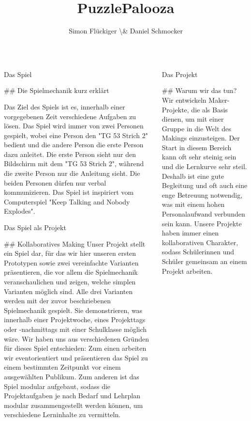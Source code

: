 \documentclass{beamer}%
\title{PuzzlePalooza}%
\author[info@swissmakers.ch]{Simon Flückiger \textbackslash{}\& Daniel Schmocker}%
\institute{Swiss Makers}%
\begin{document}
%
\normalsize%
\begin{columns}[T]%
\begin{column}{.32\textwidth}%
\begin{block}{Das Spiel}%
\begin{markdown}
## Die Spielmechanik kurz erklärt

Das Ziel des Spiels ist es, innerhalb einer vorgegebenen Zeit verschiedene Aufgaben zu lösen. Das Spiel wird immer von zwei Personen gespielt, wobei eine Person den "TG 53 Strich 2" bedient und die andere Person die erste Person dazu anleitet. Die erste Person sieht nur den Bildschirm mit dem "TG 53 Strich 2", während die zweite Person nur die Anleitung sieht. Die beiden Personen dürfen nur verbal kommunizieren. Das Spiel ist inspiriert vom Computerspiel "Keep Talking and Nobody Explodes".
\end{markdown}%
\end{block}%
\begin{block}{Das Spiel als Projekt}%
\begin{markdown}
## Kollaboratives Making
Unser Projekt stellt ein Spiel dar, für das wir hier unseren ersten Prototypen sowie zwei vereinfachte Varianten präsentieren, die vor allem die Spielmechanik veranschaulichen und zeigen, welche simplen Varianten möglich sind. Alle drei Varianten werden mit der zuvor beschriebenen Spielmechanik gespielt. Sie demonstrieren, was innerhalb einer Projektwoche, eines Projekttags oder -nachmittags mit einer Schulklasse möglich wäre. Wir haben uns aus verschiedenen Gründen für dieses Spiel entschieden: Zum einen arbeiten wir eventorientiert und präsentieren das Spiel zu einem bestimmten Zeitpunkt vor einem ausgewählten Publikum. Zum anderen ist das Spiel modular aufgebaut, sodass die Projektaufgaben je nach Bedarf und Lehrplan modular zusammengestellt werden können, um verschiedene Lerninhalte zu vermitteln.
\end{markdown}%
\end{block}%
\end{column}%
\begin{column}{.32\textwidth}%
\begin{block}{Das Projekt}%
\begin{markdown}
## Warum wir das tun?
Wir entwickeln Maker-Projekte, die als Basis dienen, um mit einer Gruppe in die Welt des Makings einzusteigen. Der Start in diesem Bereich kann oft sehr steinig sein und die Lernkurve sehr steil. Deshalb ist eine gute Begleitung und oft auch eine enge Betreuung notwendig, was mit einem hohen Personalaufwand verbunden sein kann. Unsere Projekte haben immer einen kollaborativen Charakter, sodass Schülerinnen und Schüler gemeinsam an einem Projekt arbeiten.

\end{markdown}
\end{block}
\end{column}
\end{columns}
\end{document}
